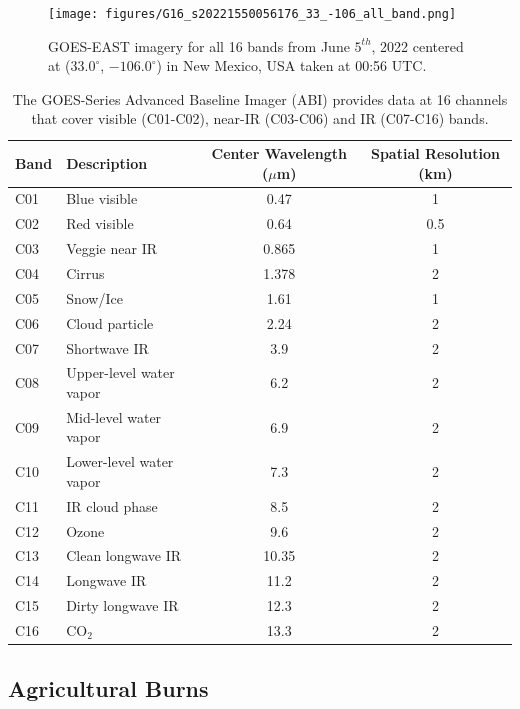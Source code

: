 \documentclass{article}
\begin{document}
\begin{figure}[!htb]
    \centering
    \texttt{[image: figures/G16\_s20221550056176\_33\_-106\_all\_band.png]}
    \caption{GOES-EAST imagery for all 16 bands from June \(5^{th}\), 2022 centered at (\(33.0^{\circ}\), \(-106.0^{\circ}\)) in New Mexico, USA taken at 00:56 UTC.}\label{all_bands}
\end{figure}

\begin{table}[!htb]
\centering
\caption{The GOES-Series Advanced Baseline Imager (ABI) provides data at 16 channels that cover visible (C01-C02), near-IR (C03-C06) and IR (C07-C16) bands.}
\begin{tabular}{llcc}
\toprule
\textbf{Band} & \textbf{Description} & \textbf{Center Wavelength (\(\mu\)m)} & \textbf{Spatial Resolution (km)} \\
\midrule
C01  & Blue visible                & 0.47     & 1   \\
C02  & Red visible                 & 0.64     & 0.5 \\
C03  & Veggie near IR             & 0.865    & 1   \\
C04  & Cirrus                     & 1.378    & 2   \\
C05  & Snow/Ice                   & 1.61     & 1   \\
C06  & Cloud particle             & 2.24     & 2   \\
C07  & Shortwave IR               & 3.9      & 2   \\
C08  & Upper-level water vapor    & 6.2      & 2   \\
C09  & Mid-level water vapor      & 6.9      & 2   \\
C10  & Lower-level water vapor    & 7.3      & 2   \\
C11  & IR cloud phase             & 8.5      & 2   \\
C12  & Ozone                      & 9.6      & 2   \\
C13  & Clean longwave IR          & 10.35    & 2   \\
C14  & Longwave IR                & 11.2     & 2   \\
C15  & Dirty longwave IR          & 12.3     & 2   \\
C16  & CO\(_2\)                         & 13.3     & 2   \\
\bottomrule
\end{tabular}
\label{band_table}
\end{table}


\subsection{Agricultural Burns}
\end{document}
